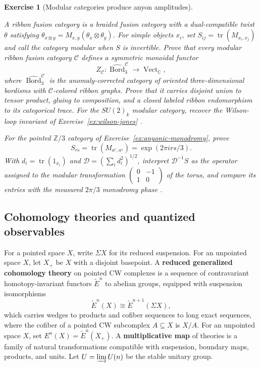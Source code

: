 \documentclass{article}
\newtheorem{exercise}{Exercise}
\newcommand{\trace}{\operatorname{tr}}
\begin{document}
\begin{exercise}[Modular categories produce anyon amplitudes]
\label{ex:rt-tqft}\leavevmode\par
\textit{A ribbon fusion category is a braided fusion category with a
dual-compatible twist $\theta$ satisfying
$\theta_{x\otimes y}=M_{x,y}(\theta_x\otimes\theta_y)$. For simple objects
$x_i$, set $S_{ij}=\trace(M_{x_i,x_j})$ and call the category modular when
$S$ is invertible. Prove that every modular ribbon fusion category
$\mathcal C$ defines a symmetric monoidal functor}
\cite{reshetikhin-turaev}
\[
Z_{\mathcal C}:\widehat{\operatorname{Bord}}_3^{\mathcal C}
\longrightarrow\operatorname{Vect}_{\mathbb C},
\]
\textit{where $\widehat{\operatorname{Bord}}_3^{\mathcal C}$ is the
anomaly-corrected category of oriented three-dimensional bordisms with
$\mathcal C$-colored ribbon graphs. Prove that it carries disjoint union to
tensor product, gluing to composition, and a closed labeled ribbon
endomorphism to its categorical trace. For the $SU(2)_k$ modular category,
recover the Wilson-loop invariant of
Exercise~\ref{ex:wilson-jones}}
\cite{witten-jones,reshetikhin-turaev}.

\textit{For the pointed $\mathbb Z/3$ category of
Exercise~\ref{ex:anyonic-monodromy}, prove}
\[
S_{rs}=\trace(M_{a^r,a^s})=\exp(2\pi i rs/3).
\]
\textit{With $d_i=\trace(1_{x_i})$ and
$\mathcal D=(\sum_i d_i^2)^{1/2}$, interpret $\mathcal D^{-1}S$ as the
operator assigned to the modular transformation
$\left(\begin{smallmatrix}0&-1\\1&0\end{smallmatrix}\right)$ of the torus,
and compare its entries with the measured $2\pi/3$ monodromy phase}
\cite{nakamura-anyons}.\par
\end{exercise}

\subsection{Cohomology theories and quantized observables}

For a pointed space $X$, write $\Sigma X$ for its reduced suspension. For an
unpointed space $X$, let $X_+$ be $X$ with a disjoint basepoint.
A \textbf{reduced generalized cohomology theory} on pointed CW complexes is
a sequence of contravariant homotopy-invariant functors $\widetilde E^n$ to
abelian groups, equipped with suspension isomorphisms
\[
\widetilde E^n(X)\cong\widetilde E^{n+1}(\Sigma X),
\]
which carries wedges to products and cofiber sequences to long exact
sequences, where the cofiber of a pointed CW subcomplex $A\subseteq X$ is
$X/A$. For an unpointed space $X$, set
$E^n(X)=\widetilde E^n(X_+)$. A \textbf{multiplicative map} of theories is a
family of natural transformations compatible with suspension, boundary
maps, products, and units. Let $U=\varinjlim U(n)$ be the stable unitary
group.
\end{document}
